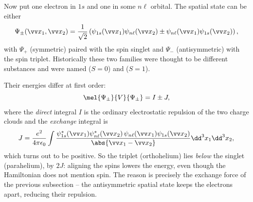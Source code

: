 \begin{example}
    Now put one electron in $1s$ and one in some $n\ell$ orbital. The spatial state can be either
    $$
    \Psi_\pm(\vv x_1,\vv x_2) = \frac{1}{\sqrt2}\left( \psi_{1s}(\vv x_1)\psi_{n\ell}(\vv x_2) \pm \psi_{n\ell}(\vv x_1)\psi_{1s}(\vv x_2) \right),
    $$
    with $\Psi_+$ (symmetric) paired with the spin singlet and $\Psi_-$ (antisymmetric) with the spin triplet. Historically these two families were thought to be different substances and were named  ($S = 0$) and  ($S=1$).

    Their energies differ at first order:
    $$
    \mel{\Psi_\pm}{V}{\Psi_\pm} = I \pm J,
    $$
    where the \emph{direct} integral $I$ is the ordinary electrostatic repulsion of the two charge clouds and the \emph{exchange} integral is
    $$
    J = \frac{e^2}{4\pi\epsilon_0}\int \frac{\psi_{1s}^*(\vv x_1)\psi_{n\ell}^*(\vv x_2)\,\psi_{n\ell}(\vv x_1)\psi_{1s}(\vv x_2)}{\abs{\vv x_1 - \vv x_2}}\dd^3x_1 \dd^3x_2,
    $$
    which turns out to be positive. So the triplet (orthohelium) lies \emph{below} the singlet (parahelium), by $2J$: aligning the spins lowers the energy, even though the Hamiltonian does not mention spin. The reason is precisely the exchange force of the previous subsection -- the antisymmetric spatial state keeps the electrons apart, reducing their repulsion.
\end{example}

\begin{center}
\end{center}

